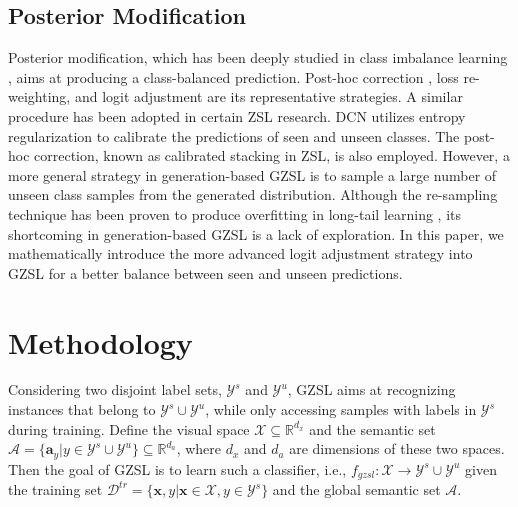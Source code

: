 \documentclass{article}
\begin{document}
\subsection{Posterior Modification}
Posterior modification, which has been deeply studied in class imbalance learning \cite{lin2017focal,menon2020long}, aims at producing a class-balanced prediction. Post-hoc correction \cite{collell2016reviving}, loss re-weighting\cite{menon2013statistical}, and logit adjustment \cite{menon2020long} are its representative strategies. A similar procedure has been adopted in certain ZSL research. DCN \cite{liu2018generalized} utilizes entropy regularization to calibrate the predictions of seen and unseen classes. The post-hoc correction, known as calibrated stacking \cite{chao2016empirical} in ZSL, is also employed. However, a more general strategy in generation-based GZSL is to sample a large number of unseen class samples from the generated distribution. Although the re-sampling technique \cite{chawla2002smote} has been proven to produce overfitting in long-tail learning \cite{collell2016reviving}, its shortcoming in generation-based GZSL is a lack of exploration. In this paper, we mathematically introduce the more advanced logit adjustment strategy into GZSL for a better balance between seen and unseen predictions.

	\section{Methodology}
	
	Considering two disjoint label sets, $\mathcal{Y}^{s}$ and $\mathcal{Y}^{u}$, GZSL aims at recognizing instances that belong to $\mathcal{Y}^{s}\cup\mathcal{Y}^u$, while only accessing samples with labels in $\mathcal{Y}^{s}$ during training. Define the visual space $\mathcal{X} \subseteq \mathbb{R}^{d_x}$ and the semantic set $\mathcal{A}=\{\mathbf{a}_y|y\in \mathcal{Y}^{s}\cup\mathcal{Y}^u\} \subseteq \mathbb{R}^{d_a}$, where $d_x$ and $d_a$ are dimensions of these two spaces. Then the goal of GZSL is to learn such a classifier, i.e., $f_{gzsl}:\mathcal{X}\rightarrow\mathcal{Y}^{s}\cup\mathcal{Y}^u$ given the training set $\mathcal{D}^{tr}=\{ \mathbf{x},y |\mathbf{x}\in \mathcal{X},y\in \mathcal{Y}^{s}\}$ and the global semantic set $\mathcal{A}$.
	
\end{document}
